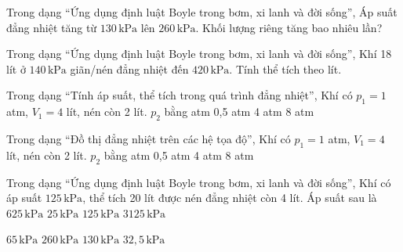 \begin{ex}
Trong dạng “Ứng dụng định luật Boyle trong bơm, xi lanh và đời sống”, Áp suất đẳng nhiệt tăng từ $130\,\text{kPa}$ lên $260\,\text{kPa}$. Khối lượng riêng tăng bao nhiêu lần?
\end{ex}

\begin{ex}
Trong dạng “Ứng dụng định luật Boyle trong bơm, xi lanh và đời sống”, Khí 18 lít ở $140\,\text{kPa}$ giãn/nén đẳng nhiệt đến $420\,\text{kPa}$. Tính thể tích theo lít.
\end{ex}

\begin{ex}
Trong dạng “Tính áp suất, thể tích trong quá trình đẳng nhiệt”, Khí có $p_1=1$ atm, $V_1=4$ lít, nén còn 2 lít. $p_2$ bằng
\choice
{ atm}
{0,5 atm}
{4 atm}
{8 atm}
\end{ex}

\begin{ex}
Trong dạng “Đồ thị đẳng nhiệt trên các hệ tọa độ”, Khí có $p_1=1$ atm, $V_1=4$ lít, nén còn 2 lít. $p_2$ bằng
\choice
{ atm}
{0,5 atm}
{4 atm}
{8 atm}
\end{ex}

\begin{ex}
Trong dạng “Ứng dụng định luật Boyle trong bơm, xi lanh và đời sống”, Khí có áp suất $125\,\text{kPa}$, thể tích 20 lít được nén đẳng nhiệt còn 4 lít. Áp suất sau là
\choice
{\True $625\,\text{kPa}$}
{$25\,\text{kPa}$}
{$125\,\text{kPa}$}
{$3125\,\text{kPa}$}
\end{ex}

\begin{ex}
\choice
{\True $65\,\text{kPa}$}
{$260\,\text{kPa}$}
{$130\,\text{kPa}$}
{$32,5\,\text{kPa}$}
\end{ex}
